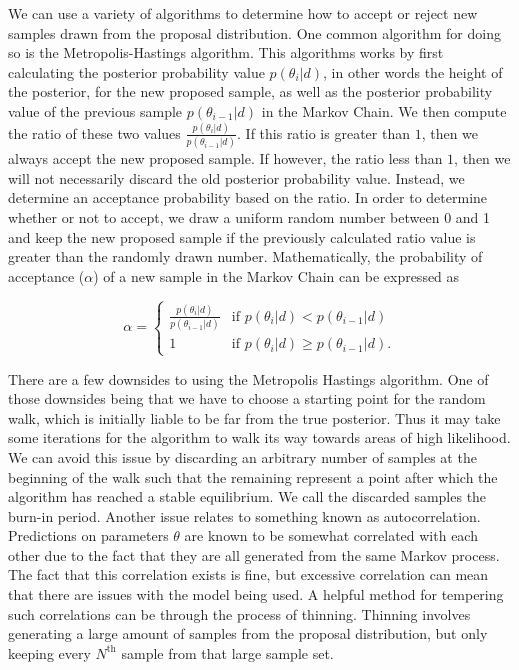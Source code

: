 %
%

We can use a variety of algorithms to determine how to accept or reject new samples drawn from the proposal distribution. One common algorithm for doing so is the Metropolis-Hastings algorithm. This algorithms works by first calculating the posterior probability value $p(\theta_i|d)$, in other words the height of the posterior, for the new proposed sample, as well as the posterior probability value of the previous sample $p(\theta_{i-1}|d)$ in the Markov Chain. We then compute the ratio of these two values $\frac{p(\theta_i|d)}{p(\theta_{i-1}|d)}$. If this ratio is greater than $1$, then we always accept the new proposed sample. If however, the ratio less than $1$, then we will not necessarily discard the old posterior probability value. Instead, we determine an acceptance probability based on the ratio. In order to determine whether or not to accept, we draw a uniform random number between 0 and 1 and keep the new proposed sample if the previously calculated ratio value is greater than the randomly drawn number. Mathematically, the probability of acceptance ($\alpha$) of a new sample in the Markov Chain can be expressed as

\begin{equation} \label{eq:MCMC_acceptance}
    \alpha = \begin{cases}
  \frac{p(\theta_i|d)}{p(\theta_{i-1}|d)} & \text{if } p(\theta_i|d) < p(\theta_{i-1}|d)\\    
  1 & \text{if } p(\theta_i|d) \ge p(\theta_{i-1}|d).       
  \end{cases}
\end{equation}

%
%
There are a few downsides to using the Metropolis Hastings algorithm. One of those downsides being that we have to choose a starting point for the random walk, which is initially liable to be far from the true posterior. Thus it may take some iterations for the algorithm to walk its way towards areas of high likelihood. We can avoid this issue by discarding an arbitrary number of samples at the beginning of the walk such that the remaining represent a point after which the algorithm has reached a stable equilibrium. We call the discarded samples the burn-in period. Another issue relates to something known as autocorrelation. Predictions on parameters $\theta$ are known to be somewhat correlated with each other due to the fact that they are all generated from the same Markov process. The fact that this correlation exists is fine, but excessive correlation can mean that there are issues with the model being used. A helpful method for tempering such correlations can be through the process of thinning. Thinning involves generating a large amount of samples from the proposal distribution, but only keeping every $N^{\textrm{th}}$ sample from that large sample set. 

